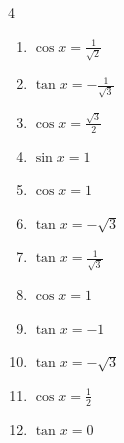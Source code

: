 \begin{multicols}{4}
\begin{enumerate}
  \item $\displaystyle \cos{x}  = \frac{1}{\sqrt{2}}$


  \item $\displaystyle \tan{x}  = -\frac{1}{\sqrt{3}}$


  \item $\displaystyle \cos{x}  = \frac{\sqrt{3}}{2}$


  \item $\displaystyle \sin{x}  = 1$


  \item $\displaystyle \cos{x}  = 1$

        \phantom{$\displaystyle x = 0$}

  \item $\displaystyle \tan{x}  = -\sqrt{3}$


  \item $\displaystyle \tan{x}  = \frac{1}{\sqrt{3}}$


  \item $\displaystyle \cos{x}  = 1$

        \phantom{$\displaystyle x = 0$}

  \item $\displaystyle \tan{x}  = -1$


  \item $\displaystyle \tan{x}  = -\sqrt{3}$


  \item $\displaystyle \cos{x}  = \frac{1}{2}$


  \item $\displaystyle \tan{x}  = 0$


\end{enumerate}
\end{multicols}
